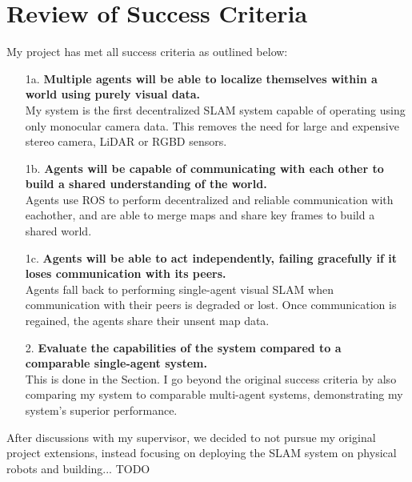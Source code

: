 

\label{sec:4}

\section{Review of Success Criteria}
\label{sec:review-of-success-criteria}
My project has met all success criteria as outlined below:

\begin{enumerate}[font=\bfseries]
    \item[1a.]\textbf{Multiple agents will be able to localize themselves within a world using purely visual data.} \\
    My system is the first decentralized SLAM system capable of operating using only monocular camera data. This removes the need for large and expensive stereo camera, LiDAR or RGBD sensors.

    \item[1b.]\textbf{Agents will be capable of communicating with each other to build a shared understanding of the world.} \\
    Agents use ROS to perform decentralized and reliable communication with eachother, and are able to merge maps and share key frames to build a shared world.

    \item[1c.]\textbf{Agents will be able to act independently, failing gracefully if it loses communication with its peers.} \\
    Agents fall back to performing single-agent visual SLAM when communication with their peers is degraded or lost. Once communication is regained, the agents share their unsent map data.

    \item[2.]\textbf{Evaluate the capabilities of the system compared to a comparable single-agent system.} \\
    This is done in the  Section. I go beyond the original success criteria by also comparing my system to comparable multi-agent systems, demonstrating my system's superior performance.

\end{enumerate}


After discussions with my supervisor, we decided to not pursue my original project extensions, instead focusing on deploying the SLAM system on physical robots and building... TODO

